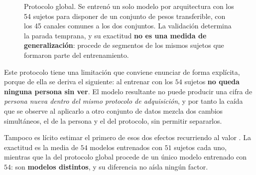 \begin{figure}[H]
\centering
{}
\caption{Protocolo global. Se entrenó un solo modelo por arquitectura con los 54 sujetos
para disponer de un conjunto de pesos transferible, con los 45 canales comunes a los dos
conjuntos. La validación determina la parada temprana, y su exactitud \textbf{no es una medida
de generalización}: procede de segmentos de los mismos sujetos que formaron parte del
entrenamiento.}
\label{fig:global}
\end{figure}

Este protocolo tiene una limitación que conviene enunciar de forma explícita, porque de
ella se deriva el siguiente: al entrenar con los $54$ sujetos \textbf{no queda ninguna persona
sin ver}. El modelo resultante no puede producir una cifra de \emph{persona nueva dentro
del mismo protocolo de adquisición}, y por tanto la caída que se observe al aplicarlo a otro
conjunto de datos mezcla dos cambios simultáneos, el de la persona y el del protocolo, sin
permitir separarlos.

Tampoco es lícito estimar el primero de esos dos efectos recurriendo al valor \loso{}. La
exactitud \loso{} es la media de $54$ modelos entrenados con $51$ sujetos cada uno, mientras
que la del protocolo global procede de un único modelo entrenado con $54$: son
\textbf{modelos distintos}, y su diferencia no aísla ningún factor.

